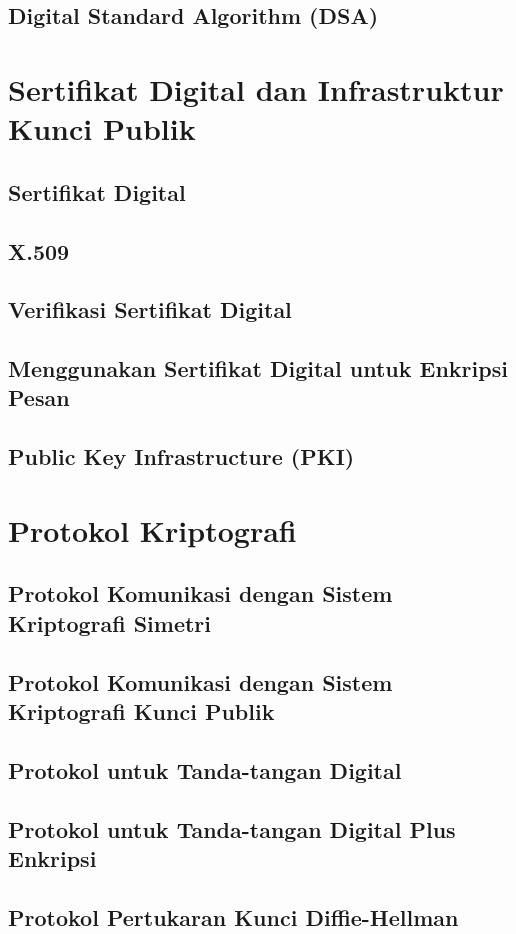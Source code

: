 \documentclass{book}
\begin{document}
     \section{Digital Standard Algorithm (DSA)}
\chapter{Sertifikat Digital dan Infrastruktur Kunci Publik}
     \section{Sertifikat Digital}
     \section{X.509}
     \section{Verifikasi Sertifikat Digital}
     \section{Menggunakan Sertifikat Digital untuk Enkripsi Pesan}
     \section{Public Key Infrastructure (PKI)}
\chapter{Protokol Kriptografi}
     \section{Protokol Komunikasi dengan Sistem Kriptografi Simetri}
     \section{Protokol Komunikasi dengan Sistem Kriptografi Kunci Publik}
     \section{Protokol untuk Tanda-tangan Digital}
     \section{Protokol untuk Tanda-tangan Digital Plus Enkripsi}
     \section{Protokol Pertukaran Kunci Diffie-Hellman}
\end{document}
